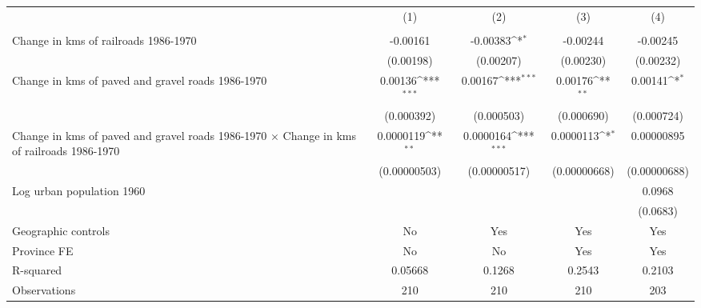 {
\def\sym#1{\ifmmode^{#1}\else\(^{#1}\)\fi}
\begin{tabular}{l*{4}{c}}
\hline\hline
                &\multicolumn{1}{c}{(1)}&\multicolumn{1}{c}{(2)}&\multicolumn{1}{c}{(3)}&\multicolumn{1}{c}{(4)}\\
                &\multicolumn{1}{c}{}&\multicolumn{1}{c}{}&\multicolumn{1}{c}{}&\multicolumn{1}{c}{}\\
\hline
Change in kms of railroads 1986-1970& -0.00161         & -0.00383\sym{*}  & -0.00244         & -0.00245         \\
                &(0.00198)         &(0.00207)         &(0.00230)         &(0.00232)         \\
[1em]
Change in kms of paved and gravel roads 1986-1970&  0.00136\sym{***}&  0.00167\sym{***}&  0.00176\sym{**} &  0.00141\sym{*}  \\
                &(0.000392)         &(0.000503)         &(0.000690)         &(0.000724)         \\
[1em]
Change in kms of paved and gravel roads 1986-1970 $\times$ Change in kms of railroads 1986-1970&0.0000119\sym{**} &0.0000164\sym{***}&0.0000113\sym{*}  &0.00000895         \\
                &(0.00000503)         &(0.00000517)         &(0.00000668)         &(0.00000688)         \\
[1em]
Log urban population 1960&                  &                  &                  &   0.0968         \\
                &                  &                  &                  & (0.0683)         \\
\hline
Geographic controls&       No         &      Yes         &      Yes         &      Yes         \\
Province FE     &       No         &       No         &      Yes         &      Yes         \\
R-squared       &  0.05668         &   0.1268         &   0.2543         &   0.2103         \\
Observations    &      210         &      210         &      210         &      203         \\
\hline\hline
\end{tabular}
}
